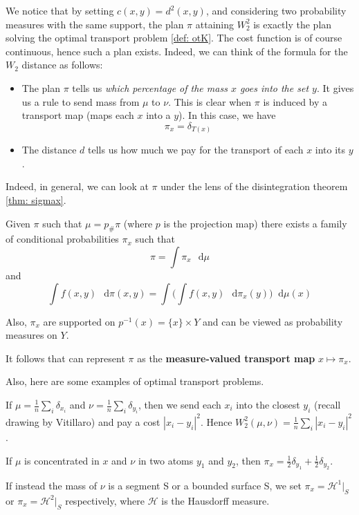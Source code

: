 \documentclass[a4paper,12pt,reqno]{amsbook}
\theoremstyle{definition} %
\newcommand*\de{\mathop{}\!\mathrm{d}}
\newcommand{\1}{\mathbbm{1}}
\theoremstyle{plain}
\theoremstyle{remark}
\begin{document}
We notice that by setting $c(x,y) = d^2(x,y)  $, and considering two probability measures with the same support, the plan $\pi$ attaining $W^2_2$ is exactly the plan solving the optimal transport problem \ref{def: otK}. The cost function is of course continuous, hence such a plan exists. Indeed, we can think of the formula for the $W_2$ distance as follows:
\begin{itemize}
    \item The plan $\pi$ tells us \textit{which percentage of the mass $x$ goes into the set $y$}. It gives us a rule to send mass from $\mu$ to $\nu$. 
    This is clear when $\pi$ is induced by a transport map (maps each $x$ into a $y$). In this case, we have
    \[
    \pi_x = \delta_{T(x)}
    \]
    \item The distance $d$ tells us how much we pay for the transport of each $x$ into its $y$.
\end{itemize}

Indeed, in general, we can look at $\pi$ under the lens of the disintegration theorem \ref{thm: sigmax}. 

Given $\pi$ such that $\mu = p_\#\pi$ (where $p$ is the projection map) there exists a family of conditional probabilities $\pi_x$ such that
     \[\pi = \int \pi_x \,\de{\mu}\]
    and
    \[
    \int f(x,y) \, \de{\pi}(x,y) = \int \bigg(\int f(x,y) \, \de{\pi}_x(y)\bigg) \de{\mu}(x)
    \]
    
    Also, $\pi_x$ are supported on $p^{-1}(x) = \{x\}\times Y$ and can be viewed as probability measures on $Y$. 
    
    It follows that can represent $\pi$ as the \textbf{measure-valued transport map} $x \mapsto \pi_x$.

Also, here are some examples of optimal transport problems. 
\begin{example}
    If $\mu = \frac{1}{n}\sum_i \delta_{x_i}$ and $\nu = \frac{1}{n}\sum_i \delta_{y_i}$, then we send each $x_i$ into the closest $y_i$ (recall drawing by Vitillaro) and pay a cost $|x_i - y_i|^2.$ Hence $W_2^2(\mu,\nu) = \frac{1}{n}\sum_i |x_i - y_i|^2 $.
\end{example}

\begin{example}
    If $\mu$ is concentrated in $x$ and $\nu$ in two atoms $y_1$ and $y_2$, then $\pi_x = \frac{1}{2}\delta_{y_1} + \frac{1}{2}\delta_{y_2}$.
\end{example}

\begin{example}
    If instead the mass of $\nu$ is a segment S or a bounded surface S, we set $\pi_x = \mathscr{H}^1|_S$ or $\pi_x = \mathscr{H}^2|_S$ respectively, where $\mathscr{H}$ is the Hausdorff measure. 
\end{example}
\end{document}
